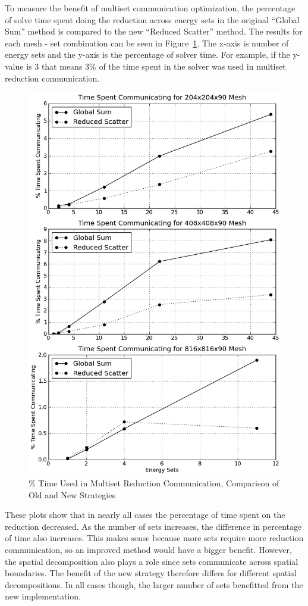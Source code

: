 To measure the benefit of multiset communication optimization, the percentage of solve time spent doing the reduction across energy sets in the original ``Global Sum'' method is compared to the new ``Reduced Scatter'' method. The results for each mesh - set combination can be seen in Figure~\ref{fig:MultisetCommOpt}. The x-axis is number of energy sets and the y-axis is the percentage of solver time. For example, if the y-value is 3 that means 3\% of the time spent in the solver was used in multiset reduction communication. 
%
\begin{figure}[!h]
  \begin{center}
    \includegraphics [width=.7\textwidth, height=0.85\textheight ] {MultisetCommOpt}
  \end{center}
  \caption{\% Time Used in Multiset Reduction Communication, Comparison of Old and New Strategies}
  \label{fig:MultisetCommOpt}
\end{figure}

These plots show that in nearly all cases the percentage of time spent on the reduction decreased. As the number of sets increases, the difference in percentage of time also increases. This makes sense because more sets require more reduction communication, so an improved method would have a bigger benefit. However, the spatial decomposition also plays a role since sets communicate across spatial boundaries. The benefit of the new strategy therefore differs for different spatial decompositions. In all cases though, the larger number of sets benefitted from the new implementation. 

